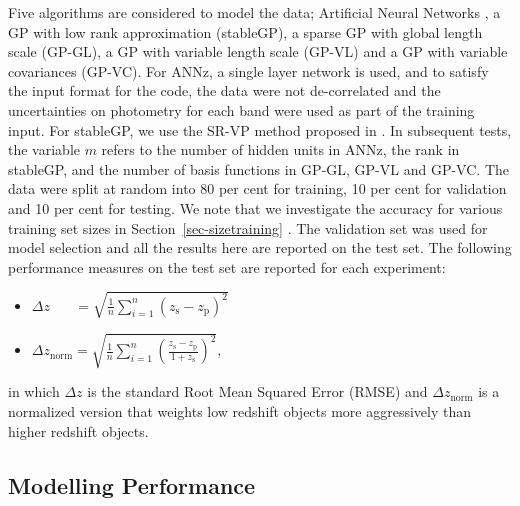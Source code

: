\documentclass[useAMS,usenatbib,fleqn]{mn2e}
\begin{document}
Five algorithms are considered to model the data; Artificial Neural Networks \citep[ANNz;][]{Collister04}, a GP with low rank approximation (stableGP), a sparse GP with global length scale (GP-GL), a GP with variable length scale (GP-VL) and a GP with variable covariances (GP-VC). For ANNz, a single layer network is used, and to satisfy the input format for the code, the data were not de-correlated and the uncertainties on photometry for each band were used as part of the training input. For stableGP, we use the SR-VP method proposed in \citep{foster2009}. In subsequent tests, the variable $m$ refers to the number of hidden units in ANNz, the rank in stableGP, and the number of basis functions in GP-GL, GP-VL and GP-VC. The data were split at random into 80 per cent for training, 10 per cent for validation and 10 per cent for testing. We note that we investigate the accuracy for various training set sizes in Section~\ref{sec-sizetraining} . The validation set was used for model selection and all the results here are reported on the test set. The following performance measures on the test set are reported for each experiment:
\begin{itemize}
  \item $\Delta z_{\phantom{norm}} = \sqrt{\frac{1}{n}\sum_{i=1}^{n}\left(z_\textrm{s}-z_\textrm{p}\right)^{2}}$
  \item $\Delta z_\textrm{norm} = \sqrt{\frac{1}{n}\sum_{i=1}^{n}\left(\frac{z_\textrm{s}-z_\textrm{p}}{1+z_\textrm{s}}\right)^{2}}$,
\end{itemize}
in which $\Delta z$ is the standard Root Mean Squared Error (RMSE) and $\Delta z_\textrm{norm}$ is a normalized version that weights low redshift objects more aggressively than higher redshift objects. %

\subsection{Modelling Performance}
\end{document}
